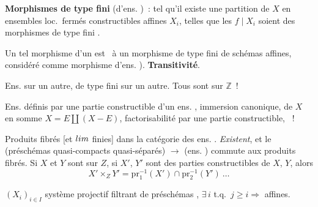 \documentclass[11pt,a4paper]{article}
\begin{document}



\textbf{Morphismes de type fini} (d'ens. )~: tel qu'il
existe une partition de $X$ en ensembles loc.\ fermés
constructibles affines $X_i$, telles que les
$f \mid X_i$ soient des morphismes de type fini .

Un tel morphisme d'un   est \
à un morphisme de type fini de schémas
affines, considéré comme morphisme d'ens.
). \textbf{Transitivité}.

Ens.  sur un autre, de type fini sur
un autre. Tous sont sur $\mathbb{Z}$~!

Ens.  définis par une partie
constructible d'un ens. , 
immersion canonique, \uncertain{décomposition} de $X$ en
somme $X = E \amalg (X - E)$,  
factorisabilité par une partie constructible, \emph{}~!

Produits fibrés [et $\varprojlim$ finies] dans la catégorie
des ens. . \emph{Existent}, et le
  (préschémas quasi-compacts quasi-séparés) $\to$
(ens. \uncertain{schém.}) commute aux produits fibrés.
Si $X$ et $Y$ sont sur $Z$, si $X'$, $Y'$ sont des
parties constructibles de $X$, $Y$, alors
\[
X' \times_Z Y' = \mathrm{pr}_1^{-1}(X') \cap \mathrm{pr}_2^{-1}(Y') \ \dots
\]

$(X_i)_{i \in I}$ système projectif filtrant de
préschémas  ,
$\exists\, i$ t.q.\ $j \geq i \Rightarrow$  affines.
\end{document}
